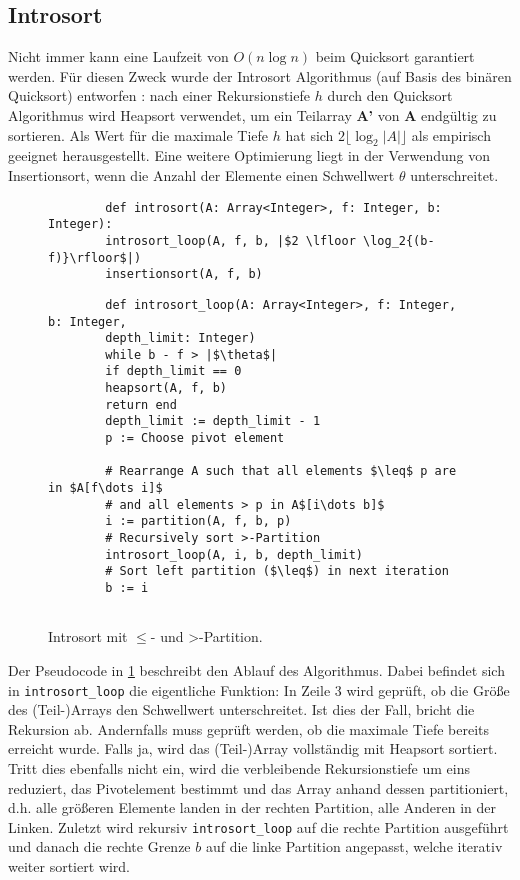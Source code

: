 \subsection{Introsort}
\label{section:introsort}

Nicht  immer kann eine Laufzeit von $O(n\log{n})$ beim Quicksort garantiert werden. Für diesen Zweck wurde der Introsort Algorithmus (auf Basis des binären Quicksort) entworfen \cite{Musser97}:
nach einer Rekursionstiefe $h$ durch den Quicksort Algorithmus wird Heapsort verwendet, um ein Teilarray \textbf{A'} von \textbf{A} endgültig zu sortieren.
Als Wert für die maximale Tiefe $h$ hat sich $2 \lfloor \log_2{|A|}\rfloor$ als empirisch geeignet herausgestellt. Eine weitere Optimierung liegt in der Verwendung von Insertionsort, wenn die Anzahl der Elemente einen Schwellwert $\theta$ unterschreitet.

\begin{figure}
	\begin{verbatim}
		def introsort(A: Array<Integer>, f: Integer, b: Integer):
		introsort_loop(A, f, b, |$2 \lfloor \log_2{(b-f)}\rfloor$|)
		insertionsort(A, f, b)
	\end{verbatim}
	
	\begin{verbatim}
		def introsort_loop(A: Array<Integer>, f: Integer, b: Integer, 
		depth_limit: Integer)
		while b - f > |$\theta$|
		if depth_limit == 0
		heapsort(A, f, b)
		return end
		depth_limit := depth_limit - 1
		p := Choose pivot element
		
		# Rearrange A such that all elements $\leq$ p are in $A[f\dots i]$
		# and all elements > p in A$[i\dots b]$
		i := partition(A, f, b, p)
		# Recursively sort >-Partition
		introsort_loop(A, i, b, depth_limit)
		# Sort left partition ($\leq$) in next iteration
		b := i
		
	\end{verbatim}
	\caption{Introsort mit \glqq $\leq$\grqq- und \glqq >\grqq-Partition.}
	\label{alg:introsort}
\end{figure}

Der Pseudocode in \ref{alg:introsort} beschreibt den Ablauf des Algorithmus. Dabei befindet sich in \texttt{introsort\_loop} die eigentliche Funktion: In Zeile 3 wird geprüft, ob die Größe des (Teil-)Arrays den Schwellwert unterschreitet. Ist dies der Fall, bricht die Rekursion ab. Andernfalls muss geprüft werden, ob die maximale Tiefe bereits erreicht wurde. Falls ja, wird das (Teil-)Array vollständig mit Heapsort sortiert.
Tritt dies ebenfalls nicht ein, wird die verbleibende Rekursionstiefe um eins reduziert, das Pivotelement bestimmt und das Array anhand dessen partitioniert, d.h. alle größeren Elemente landen in der rechten Partition, alle Anderen in der Linken. Zuletzt wird rekursiv \texttt{introsort\_loop} auf die rechte Partition ausgeführt und danach die rechte Grenze $b$ auf die linke Partition angepasst, welche iterativ weiter sortiert wird.

